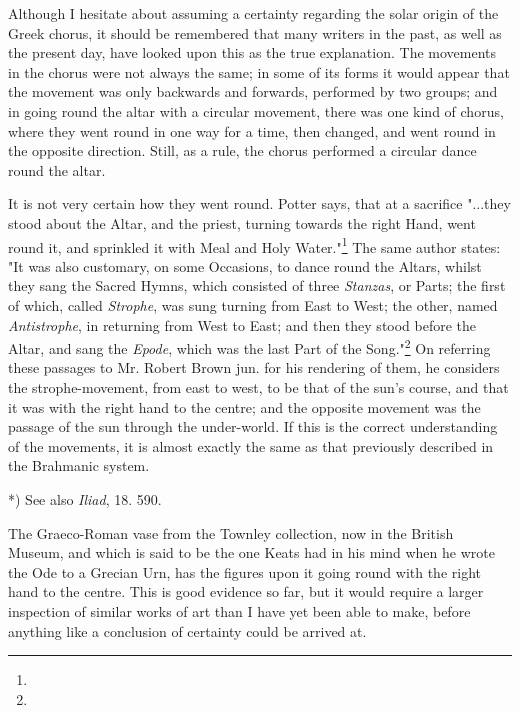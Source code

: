 \documentclass[a4paper, 11pt, oneside, polutonikogreek, english]{article}
\begin{document}
Although I hesitate about assuming a certainty regarding the solar origin of the Greek chorus, it should be remembered that many writers in the past, as well as the present day, have looked upon this as the true explanation. The movements in the chorus were not always the same; in some of its forms it would appear that the movement was only backwards and forwards, performed by two groups; and in going round the altar with a circular movement, there was one kind of chorus, where they went round in one way for a time, then changed, and went round in the opposite direction. Still, as a rule, the chorus performed a circular dance round the altar.

It is not very certain how they went round. Potter says, that at a sacrifice "...they stood about the Altar, and the priest, turning towards the right Hand, went round it, and sprinkled it with Meal and Holy Water."\footnote{} The same author states: "It was also customary, on some Occasions, to dance round the Altars, whilst they sang the Sacred Hymns, which consisted of three \emph{Stanzas}, or Parts; the first of which, called \emph{Strophe}, was sung turning from East to West; the other, named \emph{Antistrophe}, in returning from West to East; and then they stood before the Altar, and sang the \emph{Epode}, which was the last Part of the Song."\footnote{} On referring these passages to Mr. Robert Brown jun. for his rendering of them, he considers the strophe-movement, from east to west, to be that of the sun's course, and that it was with the right hand to the centre; and the opposite movement was the passage of the sun through the under-world. If this is the correct understanding of the movements, it is almost exactly the same as that previously described in the Brahmanic system.

*) See also \emph{Iliad}, 18. 590.

The Graeco-Roman vase from the Townley collection, now in the British Museum, and which is said to be the one Keats had in his mind when he wrote the Ode to a Grecian Urn, has the figures upon it going round with the right hand to the centre. This is good evidence so far, but it would require a larger inspection of similar works of art than I have yet been able to make, before anything like a conclusion of certainty could be arrived at.
\end{document}
